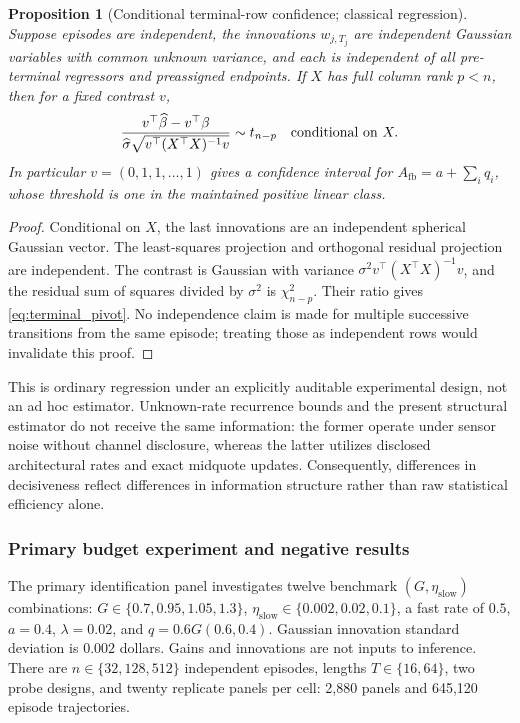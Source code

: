 \documentclass[10pt,twocolumn,letterpaper]{article}
\newtheorem{proposition}[theorem]{Proposition}
\theoremstyle{definition}
\theoremstyle{remark}
\begin{document}
\begin{proposition}[Conditional terminal-row confidence; classical regression]
\label{prop:terminal_confidence}
Suppose episodes are independent, the innovations $w_{j,T_j}$ are independent Gaussian variables with common unknown variance, and each is independent of all pre-terminal regressors and preassigned endpoints. If $X$ has full column rank $p<n$, then for a fixed contrast $v$,
\begin{equation}
 \frac{v^\top\widehat\beta-v^\top\beta}
 {\widehat\sigma\sqrt{v^\top(X^\top X)^{-1}v}}
 \sim t_{n-p}\quad\hbox{conditional on }X.
 \label{eq:terminal_pivot}
\end{equation}
In particular $v=(0,1,1,\ldots,1)$ gives a confidence interval for
$A_{\mathrm{fb}}=a+\sum_iq_i$, whose threshold is one in the maintained positive linear class.
\end{proposition}
\begin{proof}
Conditional on $X$, the last innovations are an independent spherical Gaussian vector. The least-squares projection and orthogonal residual projection are independent. The contrast is Gaussian with variance $\sigma^2v^\top(X^\top X)^{-1}v$, and the residual sum of squares divided by $\sigma^2$ is $\chi^2_{n-p}$. Their ratio gives \cref{eq:terminal_pivot}. No independence claim is made for multiple successive transitions from the same episode; treating those as independent rows would invalidate this proof.
\end{proof}

This is ordinary regression under an explicitly auditable experimental design, not an ad hoc estimator. Unknown-rate recurrence bounds and the present structural estimator do not receive the same information: the former operate under sensor noise without channel disclosure, whereas the latter utilizes disclosed architectural rates and exact midquote updates. Consequently, differences in decisiveness reflect differences in information structure rather than raw statistical efficiency alone.

\subsubsection{Primary budget experiment and negative results}
The primary identification panel investigates twelve benchmark $(G,\eta_{\mathrm{slow}})$ combinations: $G\in\{0.7,0.95,1.05,1.3\}$, $\eta_{\mathrm{slow}}\in\{0.002,0.02,0.1\}$, a fast rate of $0.5$, $a=0.4$, $\lambda=0.02$, and $q=0.6G(0.6,0.4)$. Gaussian innovation standard deviation is $0.002$ dollars. Gains and innovations are not inputs to inference. There are $n\in\{32,128,512\}$ independent episodes, lengths $T\in\{16,64\}$, two probe designs, and twenty replicate panels per cell: 2,880 panels and 645,120 episode trajectories.
\end{document}
